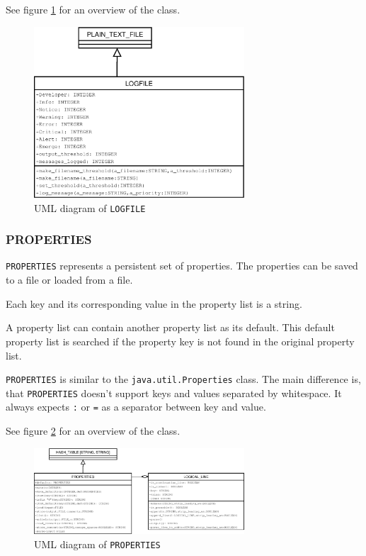 \documentclass[a4paper,fleqn,titlepage]{article}
\begin{document}
See figure \ref{fig:logfile} for an overview of the class.

\begin{figure}[htbp]
  \centering
  \includegraphics[width=0.7\textwidth]{./figures/logfile}
  \caption{UML diagram of \texttt{LOGFILE}}
  \label{fig:logfile}
\end{figure}


\subsubsection{PROPERTIES}

\texttt{PROPERTIES} represents a persistent set of properties. The
properties can be saved to a file or loaded from a file.

Each key and its corresponding value in the property list is a string.

A property list can contain another property list as its default. This
default property list is searched if the property key is not found in
the original property list.

\texttt{PROPERTIES} is similar to the \texttt{java.util.Properties}
class. The main difference is, that \texttt{PROPERTIES} doesn't
support keys and values separated by whitespace. It always expects
\texttt{:} or \texttt{=} as a separator between key and value.

See figure \ref{fig:properties} for an overview of the class.

\begin{figure}[htbp]
  \centering
  \includegraphics[width=0.7\textwidth]{./figures/properties}
  \caption{UML diagram of \texttt{PROPERTIES}}
  \label{fig:properties}
\end{figure}
\end{document}
